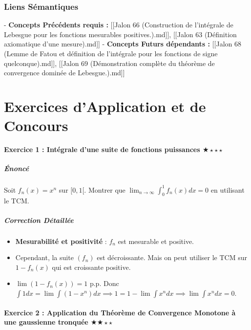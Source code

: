 \documentclass[11pt,a4paper]{article}
\begin{document}
\section{Liens Sémantiques}

- \textbf{Concepts Précédents requis :} [[Jalon 66 (Construction de l'intégrale de Lebesgue pour les fonctions mesurables positives.).md]], [[Jalon 63 (Définition axiomatique d'une mesure).md]]
- \textbf{Concepts Futurs dépendants :} [[Jalon 68 (Lemme de Fatou et définition de l'intégrale pour les fonctions de signe quelconque).md]], [[Jalon 69 (Démonstration complète du théorème de convergence dominée de Lebesgue.).md]]

\part{Exercices d'Application et de Concours}
\subsection*{Exercice 1 : Intégrale d'une suite de fonctions puissances \quad $\bigstar\star\star\star$}

\subsubsection*{Énoncé}
Soit $f_n(x) = x^n$ sur $[0, 1[$. Montrer que $\lim_{n \to \infty} \int_0^1 f_n(x) dx = 0$ en utilisant le TCM.

\subsubsection*{Correction Détaillée}
\begin{itemize}
\item \textbf{Mesurabilité et positivité} : $f_n$ est mesurable et positive.
\item Cependant, la suite $(f_n)$ est décroissante. Mais on peut utiliser le TCM sur $1 - f_n(x)$ qui est croissante positive.
\item $\lim (1 - f_n(x)) = 1$ p.p. Donc $\int 1 dx = \lim \int (1-x^n)dx \implies 1 = 1 - \lim \int x^n dx \implies \lim \int x^n dx = 0$.
\end{itemize}

\subsection*{Exercice 2 : Application du Théorème de Convergence Monotone à une gaussienne tronquée \quad $\bigstar\bigstar\star\star$}
\end{document}
